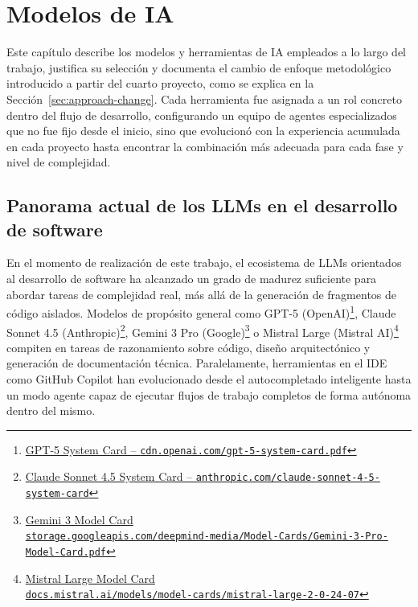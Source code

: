 
\cleardoublepage
\chapter{Modelos de IA} \label{chap:AIModels}

Este capítulo describe los modelos y herramientas de \ac{IA} empleados a lo largo del trabajo, justifica su selección y documenta el cambio de enfoque metodológico introducido a partir del cuarto proyecto, como se explica en la Sección~\ref{sec:approach-change}. Cada herramienta fue asignada a un rol concreto dentro del flujo de desarrollo, configurando un equipo de agentes especializados que no fue fijo desde el inicio, sino que evolucionó con la experiencia acumulada en cada proyecto hasta encontrar la combinación más adecuada para cada fase y nivel de complejidad.

\section{Panorama actual de los LLMs en el desarrollo de software} \label{sec:llm-overview}

En el momento de realización de este trabajo, el ecosistema de \ac{LLMs} orientados al desarrollo de software ha alcanzado un grado de madurez suficiente para abordar tareas de complejidad real, más allá de la generación de fragmentos de código aislados.
Modelos de propósito general como GPT-5 (OpenAI)\footnote{ \href{https://cdn.openai.com/gpt-5-system-card.pdf}{GPT-5 System Card -- \texttt{cdn.openai.com/gpt-5-system-card.pdf}}}, Claude Sonnet 4.5 (Anthropic)\footnote{\href{https://www.anthropic.com/claude-sonnet-4-5-system-card}{Claude Sonnet 4.5 System Card -- \texttt{anthropic.com/claude-sonnet-4-5-system-card}}}, Gemini 3 Pro (Google)\footnote{\href{https://storage.googleapis.com/deepmind-media/Model-Cards/Gemini-3-Pro-Model-Card.pdf}{Gemini 3 Model Card \\ \hspace*{1.9em} \texttt{storage.googleapis.com/deepmind-media/Model-Cards/Gemini-3-Pro-Model-Card.pdf}}} o Mistral Large (Mistral AI)\footnote{\href{https://docs.mistral.ai/models/model-cards/mistral-large-2-0-24-07}{Mistral Large Model Card \\ \hspace*{1.9em} \texttt{docs.mistral.ai/models/model-cards/mistral-large-2-0-24-07}}} compiten en tareas de razonamiento sobre código, diseño arquitectónico y generación de documentación técnica.
Paralelamente, herramientas en el \ac{IDE} como GitHub Copilot han evolucionado desde el autocompletado inteligente hasta un modo agente capaz de ejecutar flujos de trabajo completos de forma autónoma dentro del mismo.


